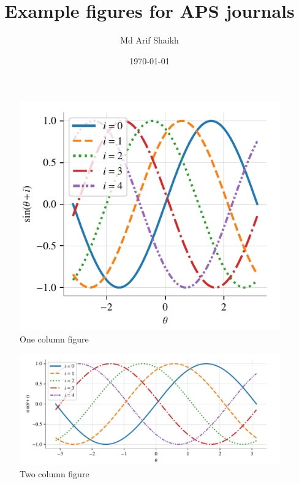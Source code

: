 \documentclass[reprint,twocolumn]{revtex4-2}
\begin{document}
\title{Example figures for APS journals}
\author{Md Arif Shaikh}
\date{\today}
\maketitle
\lipsum[1]
\begin{figure}
  \centering
  \includegraphics{../figs/APS.pdf}
  \caption{One column figure}
  \label{fig:one-col-figure}
\end{figure}
\lipsum[2-3]
\begin{figure}
  \centering
  \includegraphics{../figs/APS_twocol.pdf}
  \caption{Two column figure}
  \label{fig:two-col-figure}
\end{figure}
\lipsum[4-10]
\end{document}
